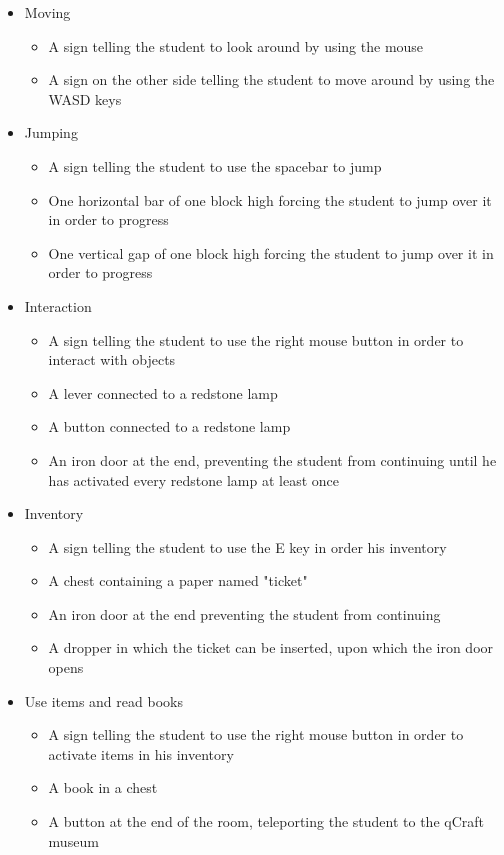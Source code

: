 \documentclass[11pt,twoside]{report} %
\begin{document}
\begin{itemize}
	\item Moving
	\begin{itemize}
		\item A sign telling the student to look around by using the mouse
		\item A sign on the other side telling the student to move around by using the WASD keys
	\end{itemize}
	\item Jumping
	\begin{itemize}
		\item A sign telling the student to use the spacebar to jump
		\item One horizontal bar of one block high forcing the student to jump over it in order to progress
		\item One vertical gap of one block high forcing the student to jump over it in order to progress
	\end{itemize}
	\item Interaction
	\begin{itemize}
		\item A sign telling the student to use the right mouse button in order to interact with objects
		\item A lever connected to a redstone lamp
		\item A button connected to a redstone lamp
		\item An iron door at the end, preventing the student from continuing until he has activated every redstone lamp at least once
	\end{itemize}
	\item Inventory
	\begin{itemize}
		\item A sign telling the student to use the E key in order his inventory
		\item A chest containing a paper named "ticket"
		\item An iron door at the end preventing the student from continuing
		\item A dropper in which the ticket can be inserted, upon which the iron door opens
	\end{itemize}
	\item Use items and read books
	\begin{itemize}
		\item A sign telling the student to use the right mouse button in order to activate items in his inventory
		\item A book in a chest
		\item A button at the end of the room, teleporting the student to the qCraft museum
	\end{itemize}
\end{itemize}
\end{document}
